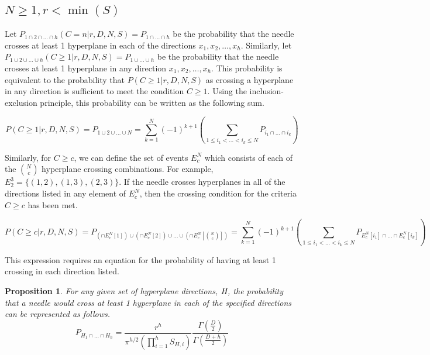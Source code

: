 \documentclass{article}
\newtheorem{proposition}{Proposition}
\begin{document}
\subsection{$N\ge 1, r<\min(S)$}
Let $P_{1\cap2\cap\hdots\cap h}(C=n|r,D,N,S)=P_{1\cap\hdots\cap h}$ be the probability that the
needle crosses at least 1 hyperplane in each of the directions $x_1, x_2, \hdots, x_h$. Similarly,
let $P_{1\cup2\cup\hdots\cup h}(C\ge 1|r,D,N,S)=P_{1\cup\hdots\cup h}$ be the probability that
the needle crosses at least 1 hyperplane in any direction $x_1, x_2, \hdots, x_h$. This probability
is equivalent to the probability that $P(C\ge 1|r,D,N,S)$ as crossing a hyperplane in any 
direction is sufficient to meet the condition $C\ge 1$. Using the inclusion-exclusion principle,
this probability can be written as the following sum.

\begin{equation}
	P(C\ge 1|r, D, N, S) = P_{1\cup2\cup\hdots\cup N} = \sum_{k=1}^N (-1)^{k+1}\left(\sum_{1\le i_1 < \hdots < i_k \le N}P_{i_1 \cap \hdots \cap i_k} \right)
\end{equation}

Similarly, for $C\ge c$, we can define the set of events $E_c^N$ which consists of each of the
$N \choose c$ hyperplane crossing combinations. For example, $E_2^3=\{(1,2), (1,3), (2,3)\}$.
If the needle crosses hyperplanes in all of the directions listed in any element of $E_c^N$,
then the crossing condition for the criteria $C \ge c$ has been met.

\begin{equation}
	P(C\ge c|r, D, N, S) = P_{(\cap E_c^N[1])\cup(\cap E_c^N[2])\cup\hdots\cup(\cap E_c^N[{N \choose c}])} = \sum_{k=1}^N (-1)^{k+1}\left(\sum_{1\le i_1 < \hdots < i_k \le N}P_{E_c^N[i_1] \cap \hdots \cap E_c^N[i_k]} \right)
\end{equation}

This expression requires an equation for the probability of having at least 1 crossing in
each direction listed. 

\begin{proposition}
	For any given set of hyperplane directions, $\emph{H}$, the probability that a needle would cross
	at least 1 hyperplane in each of the specified directions can be represented as follows.
	\begin{equation}
		P_{H_1 \cap \hdots \cap H_h} = \frac{r^h }{ \pi^{h/2} (\prod_{i=1}^h S_{H,i}) }\frac{\Gamma(\frac{D}{2})}{\Gamma(\frac{D+h}{2})}
	\end{equation}
\end{proposition}
\end{document}
